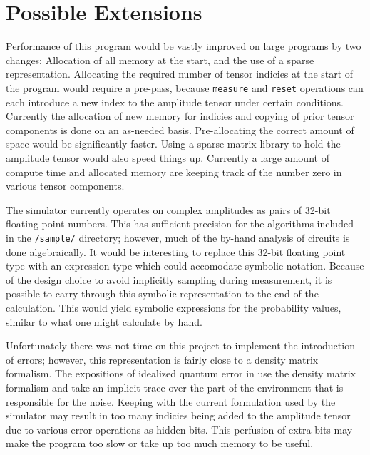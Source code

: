 \documentclass[%
 reprint,
 amsmath,amssymb,
 aps,
]{revtex4-2}
\begin{document}
\section{\label{sec:level1} \label{future} Possible Extensions}
Performance of this program would be vastly improved on large programs by two changes: Allocation of all memory at the start, and the use of a sparse representation. Allocating the required number of tensor indicies at the start of the program would require a pre-pass, because \texttt{measure} and \texttt{reset} operations can each introduce a new index to the amplitude tensor under certain conditions. Currently the allocation of new memory for indicies and copying of prior tensor components is done on an as-needed basis. Pre-allocating the correct amount of space would be significantly faster. Using a sparse matrix library to hold the amplitude tensor would also speed things up. Currently a large amount of compute time and allocated memory are keeping track of the number zero in various tensor components.

The simulator currently operates on complex amplitudes as pairs of 32-bit floating point numbers. This has sufficient precision for the algorithms included in the \texttt{/sample/} directory; however, much of the by-hand analysis of circuits is done algebraically. It would be interesting to replace this 32-bit floating point type with an expression type which could accomodate symbolic notation. Because of the design choice to avoid implicitly sampling during measurement, it is possible to carry through this symbolic representation to the end of the calculation. This would yield symbolic expressions for the probability values, similar to what one might calculate by hand.

Unfortunately there was not time on this project to implement the introduction of errors; however, this representation is fairly close to a density matrix formalism. The expositions of idealized quantum error in \cite{nielsenQuantum2010, lebellacShort2006} use the density matrix formalism and take an implicit trace over the part of the environment that is responsible for the noise. Keeping with the current formulation used by the simulator may result in too many indicies being added to the amplitude tensor due to various error operations as hidden bits. This perfusion of extra bits may make the program too slow or take up too much memory to be useful.

\nocite{*}

\end{document}
